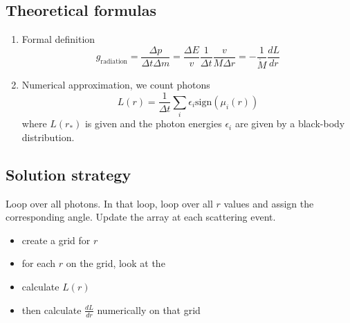 \documentclass[../main/main.tex]{subfiles}
\begin{document}
\subsection{Theoretical formulas}
\begin{enumerate}
\item Formal definition
\begin{equation}
g_{\text{radiation}} =  \frac{\Delta p}{\Delta t \Delta m} = \frac{\Delta E}{v} \frac{1}{\Delta t} \frac{v}{M \Delta r} = - \frac{1}{\dot{M}}\frac{dL}{dr}
\end{equation}

\item Numerical approximation, we count photons
\begin{equation}
L(r) = \frac{1}{\Delta t} \sum_i \epsilon_i \text{sign}(\mu_i(r))
\end{equation}
where $L(r_*)$ is given and the photon energies $\epsilon_i$ are given by a black-body distribution.
\end{enumerate}

\subsection{Solution strategy}
Loop over all photons. In that loop, loop over all $r$ values and assign the corresponding angle. Update the array at each scattering event.


\begin{itemize}
\item create a grid for $r$
\item for each $r$ on the grid, look at the 
\item calculate $L(r)$
\item then calculate $\frac{dL}{dr}$ numerically on that grid
\end{itemize}
\end{document}
